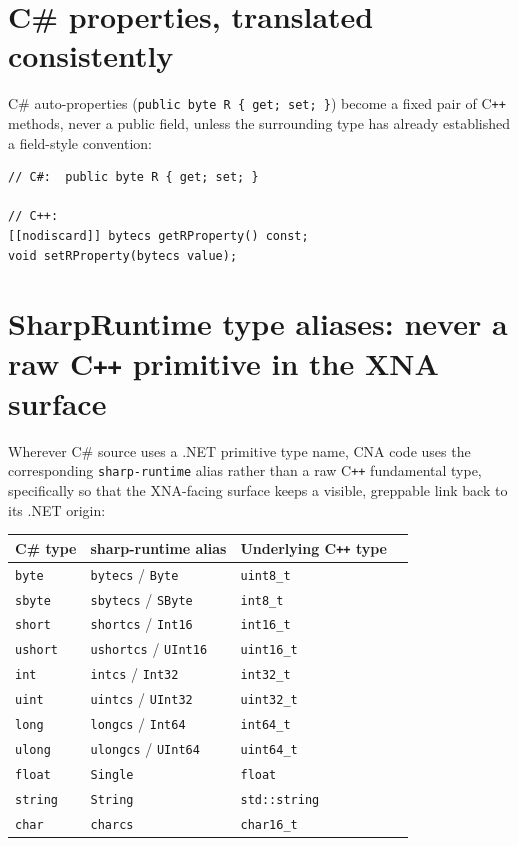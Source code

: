 \section{C\# properties, translated consistently}

C\# auto-properties (\texttt{public byte R \{ get; set; \}}) become a fixed pair of C\texttt{++}
methods, never a public field, unless the surrounding type has already established a
field-style convention:

\begin{lstlisting}
// C#:  public byte R { get; set; }

// C++:
[[nodiscard]] bytecs getRProperty() const;
void setRProperty(bytecs value);
\end{lstlisting}

\section{SharpRuntime type aliases: never a raw C\texttt{++} primitive in the XNA surface}

Wherever C\# source uses a .NET primitive type name, CNA code uses the corresponding
\texttt{sharp-runtime} alias rather than a raw C\texttt{++} fundamental type, specifically so
that the XNA-facing surface keeps a visible, greppable link back to its .NET origin:

\begin{center}
\begin{tabular}{llll}
\toprule
\textbf{C\# type} & \textbf{sharp-runtime alias} & \textbf{Underlying C\texttt{++} type} \\
\midrule
\texttt{byte}   & \texttt{bytecs} / \texttt{Byte}   & \texttt{uint8\_t} \\
\texttt{sbyte}  & \texttt{sbytecs} / \texttt{SByte} & \texttt{int8\_t} \\
\texttt{short}  & \texttt{shortcs} / \texttt{Int16} & \texttt{int16\_t} \\
\texttt{ushort} & \texttt{ushortcs} / \texttt{UInt16} & \texttt{uint16\_t} \\
\texttt{int}    & \texttt{intcs} / \texttt{Int32}   & \texttt{int32\_t} \\
\texttt{uint}   & \texttt{uintcs} / \texttt{UInt32} & \texttt{uint32\_t} \\
\texttt{long}   & \texttt{longcs} / \texttt{Int64}  & \texttt{int64\_t} \\
\texttt{ulong}  & \texttt{ulongcs} / \texttt{UInt64} & \texttt{uint64\_t} \\
\texttt{float}  & \texttt{Single}                   & \texttt{float} \\
\texttt{string} & \texttt{String}                   & \texttt{std::string} \\
\texttt{char}   & \texttt{charcs}                   & \texttt{char16\_t} \\
\bottomrule
\end{tabular}
\end{center}

